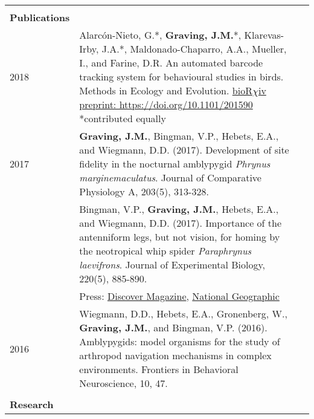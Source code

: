 \documentclass[letterpaper,10pt,oneside]{article}
\begin{document}
\begin{longtable}{@{} l p{5.3in}l}
     & \\
 \Large{\textbf{Publications}}  \vspace{5mm} \\
\large{2018}
& Alarc\'{o}n-Nieto, G.*, \textbf{Graving, J.M.}*, Klarevas-Irby, J.A.*, Maldonado-Chaparro, A.A., Mueller, I., and Farine, D.R. An automated barcode tracking system for behavioural studies in birds. Methods in Ecology and Evolution. \href{https://doi.org/10.1101/201590}{bioR$\chi$iv preprint: https://doi.org/10.1101/201590}  \small{*contributed equally}  \vspace{1mm} \\
\large{2017}
& \textbf{Graving, J.M.}, Bingman, V.P., Hebets, E.A., and Wiegmann, D.D. (2017). Development of site fidelity in the nocturnal amblypygid \textit{Phrynus marginemaculatus}. Journal of Comparative Physiology A, 203(5), 313-328. \vspace{1mm} \\
& Bingman, V.P., \textbf{Graving, J.M.}, Hebets, E.A., and Wiegmann, D.D. (2017). Importance of the antenniform legs, but not vision, for homing by the neotropical whip spider \textit{Paraphrynus laevifrons}. Journal of Experimental Biology, 220(5), 885-890.  \\
&Press: \href{http://blogs.discovermagazine.com/inkfish/2017/01/24/whip-spiders-use-their-feet-to-smell-their-way-home}{Discover Magazine}, 
\href{https://www.youtube.com/watch?v=eUoFegXxmfo}{National Geographic} \vspace{1mm} \\
\large{2016}
& Wiegmann, D.D., Hebets, E.A., Gronenberg, W., \textbf{Graving, J.M.}, and Bingman, V.P. (2016). Amblypygids: model organisms for the study of arthropod navigation mechanisms in complex environments. Frontiers in Behavioral Neuroscience, 10, 47. \vspace{1mm} \\   

 & \\ 


 \Large{\textbf{Research}}  \vspace{5mm} \\
 

\end{longtable}
\end{document}
